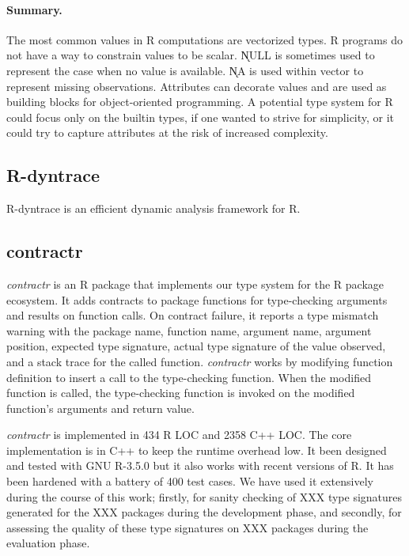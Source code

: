 \documentclass[acmsmall,review,anonymous]{acmart}\settopmatter{printfolios=true,printccs=false,printacmref=false}
\begin{document}
\paragraph{Summary.} The most common values in R computations are vectorized
types. R programs do not have a way to constrain values to be scalar.
\k{NULL} is sometimes used to represent the case when no value is
available. \k{NA} is used within vector to represent missing observations.
Attributes can decorate values and are used as building blocks for
object-oriented programming. A potential type system for R could focus only
on the builtin types, if one wanted to strive for simplicity, or it could
try to capture attributes at the risk of increased complexity.

%
%
%
%
\subsection{R-dyntrace}
\label{sec:r-dyntrace}


R-dyntrace is an efficient dynamic analysis framework for R.

\subsection{contractr}
\label{sec:contractr}
\emph{contractr} is an R package that implements our type system for the R
package ecosystem. It adds contracts to package functions for type-checking
arguments and results on function calls. On contract failure, it reports a type
mismatch warning with the package name, function name, argument name, argument
position, expected type signature, actual type signature of the value observed,
and a stack trace for the called function. \emph{contractr} works by modifying
function definition to insert a call to the type-checking function. When the
modified function is called, the type-checking function is invoked on the
modified function's arguments and return value.

\emph{contractr} is implemented in 434 R LOC and 2358 C++ LOC. The core
implementation is in C++ to keep the runtime overhead low. It been designed and
tested with GNU R-3.5.0 but it also works with recent versions of R. It has been
hardened with a battery of 400 test cases. We have used it extensively during
the course of this work; firstly, for sanity checking of XXX type signatures
generated for the XXX packages during the development phase, and secondly, for
assessing the quality of these type signatures on XXX packages during the
evaluation phase.
\end{document}
